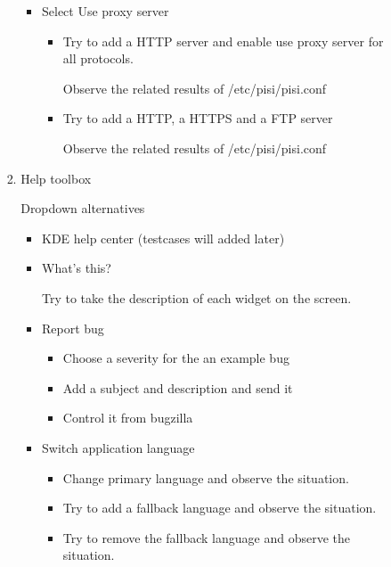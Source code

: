 \documentclass[a4paper,10pt]{article}
\begin{document}
\begin{enumerate}
\begin{enumerate}
\begin{enumerate}
\begin{enumerate}
\begin{itemize}
                    \item Select Use proxy server
    
                    \begin{itemize}
                        \item Try to add a HTTP server and enable use proxy server for all protocols.
        
                        Observe the related results of /etc/pisi/pisi.conf
        
                        \item Try to add a HTTP, a HTTPS and a FTP server
        
                        Observe the related results of /etc/pisi/pisi.conf
                    \end{itemize}
                \end{itemize}
                \item Help toolbox
    
                Dropdown alternatives
                \begin{itemize}
                    \item KDE help center (testcases will added later)
                    \item What's this? 
        
                    Try to take the description of each widget on the screen.
                    \item Report bug
                    \begin{itemize}
                        \item Choose a severity for the an example bug
                        \item Add a subject and description and send it
                        \item Control it from bugzilla
                    \end{itemize}
                    \item Switch application language
                    \begin{itemize}
                        \item Change primary language and observe the situation.
                        \item Try to add a fallback language and observe the situation.
                        \item Try to remove the fallback language and observe the situation.
                    \end{itemize}
                \end{itemize}
        \end{enumerate}
    \end{enumerate}
\end{enumerate}


\end{enumerate}
\end{document}
